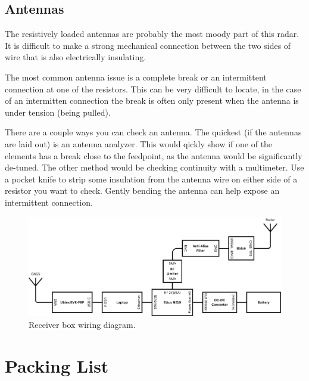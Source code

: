 \documentclass[titlepage]{article}
\begin{document}
\subsection{Antennas} \label{trouble_ant}
The resistively loaded antennas are probably the most moody part of this radar. It is difficult to make a strong mechanical connection between the two sides of wire that is also electrically insulating.

The most common antenna issue is a complete break or an intermittent connection at one of the resistors. This can be very difficult to locate, in the case of an intermitten connection the break is often only present when the antenna is under tension (being pulled).

There are a couple ways you can check an antenna. The quickest (if the antennas are laid out) is an antenna analyzer. This would qickly show if one of the elements has a break close to the feedpoint, as the antenna would be significantly de-tuned. The other method would be checking continuity with a multimeter. Use a pocket knife to strip some insulation from the antenna wire on either side of a resistor you want to check. Gently bending the antenna can help expose an intermittent connection.

\begin{figure}
\centering
\includegraphics[width=\textwidth,height=\textheight,keepaspectratio]{figs/RadarWiringDiagram_noPPS.pdf}
\caption{Receiver box wiring diagram.}
\label{fig:wiring}
\end{figure}

\newpage
\section{Packing List}
\end{document}

